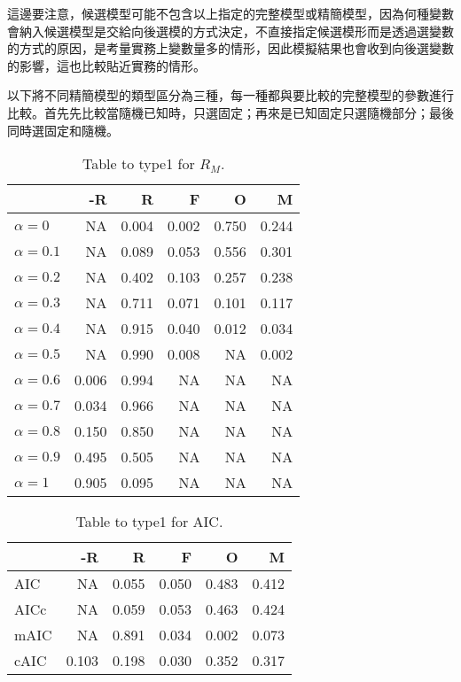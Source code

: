 這邊要注意，候選模型可能不包含以上指定的完整模型或精簡模型，因為何種變數會納入候選模型是交給向後選模的方式決定，不直接指定候選模形而是透過選變數的方式的原因，是考量實務上變數量多的情形，因此模擬結果也會收到向後選變數的影響，這也比較貼近實務的情形。\par
以下將不同精簡模型的類型區分為三種，每一種都與要比較的完整模型的參數進行比較。首先先比較當隨機已知時，只選固定；再來是已知固定只選隨機部分；最後同時選固定和隨機。\par

\begin{table}[h]
\centering
\caption{Table to type1 for $R_M$.}
\label{tab:type1rateR}
\begin{tabular}{lrrrrr}
\toprule
                 & -R    & R     & F     & O     & M \\
\midrule
$\alpha = 0$     & NA    & 0.004 & 0.002 & 0.750 & 0.244 \\
$\alpha = 0.1$   & NA    & 0.089 & 0.053 & 0.556 & 0.301 \\
$\alpha = 0.2$   & NA    & 0.402 & 0.103 & 0.257 & 0.238 \\
$\alpha = 0.3$   & NA    & 0.711 & 0.071 & 0.101 & 0.117 \\
$\alpha = 0.4$   & NA    & 0.915 & 0.040 & 0.012 & 0.034 \\
$\alpha = 0.5$   & NA    & 0.990 & 0.008 & NA    & 0.002 \\
$\alpha = 0.6$   & 0.006 & 0.994 & NA    & NA    & NA \\
$\alpha = 0.7$   & 0.034 & 0.966 & NA    & NA    & NA \\
$\alpha = 0.8$   & 0.150 & 0.850 & NA    & NA    & NA \\
$\alpha = 0.9$   & 0.495 & 0.505 & NA    & NA    & NA \\
$\alpha = 1$     & 0.905 & 0.095 & NA    & NA    & NA \\
\bottomrule
\end{tabular}
\end{table}

\begin{table}[h]
\centering
\caption{Table to type1 for AIC.}
\label{tab:type1rateAIC}
\begin{tabular}{lrrrrr}
\toprule
      & -R    & R     & F     & O     & M \\
\midrule
AIC   & NA    & 0.055 & 0.050 & 0.483 & 0.412 \\
AICc  & NA    & 0.059 & 0.053 & 0.463 & 0.424 \\
mAIC  & NA    & 0.891 & 0.034 & 0.002 & 0.073 \\
cAIC  & 0.103 & 0.198 & 0.030 & 0.352 & 0.317 \\
\bottomrule
\end{tabular}
\end{table}

